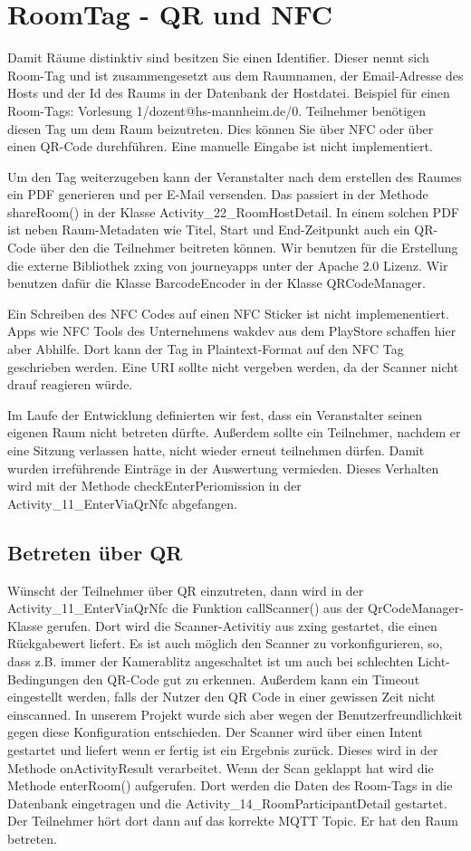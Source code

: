 \section{RoomTag - QR und NFC}
\label{sec:RoomTag - QR und NFC}
Damit Räume distinktiv sind besitzen Sie einen Identifier. Dieser nennt sich Room-Tag und ist zusammengesetzt aus dem Raumnamen, der Email-Adresse des Hosts und der Id des Raums in der Datenbank der Hostdatei. Beispiel für einen Room-Tags: Vorlesung 1/dozent@hs-mannheim.de/0.
Teilnehmer benötigen diesen Tag um dem Raum beizutreten. Dies können Sie über NFC oder über einen QR-Code durchführen. Eine manuelle Eingabe ist nicht implementiert.

Um den Tag weiterzugeben kann der Veranstalter nach dem erstellen des Raumes ein PDF generieren und per E-Mail versenden. 
Das passiert in der Methode shareRoom() in der Klasse Activity\_22\_RoomHostDetail. 
In einem solchen PDF ist neben Raum-Metadaten wie Titel, Start und End-Zeitpunkt auch ein QR-Code über den die Teilnehmer beitreten können. 
Wir benutzen für die Erstellung die externe Bibliothek zxing von journeyapps unter der Apache 2.0 Lizenz. Wir benutzen dafür die Klasse BarcodeEncoder in der Klasse QRCodeManager.

Ein Schreiben des NFC Codes auf einen NFC Sticker ist nicht implemenentiert.
 Apps wie NFC Tools des Unternehmens wakdev aus dem PlayStore schaffen hier aber Abhilfe. Dort kann der Tag in Plaintext-Format auf den NFC Tag geschrieben werden.
Eine URI sollte nicht vergeben werden, da der Scanner nicht drauf reagieren würde.

Im Laufe der Entwicklung definierten wir fest, dass ein Veranstalter seinen eigenen Raum nicht betreten dürfte. Außerdem sollte ein Teilnehmer, nachdem er eine Sitzung verlassen hatte, nicht wieder erneut teilnehmen dürfen. Damit wurden irreführende Einträge in der Auswertung vermieden. Dieses Verhalten wird mit der Methode checkEnterPeriomission in der Activity\_11\_EnterViaQrNfc abgefangen.
\subsection{Betreten über QR}
\label{subsec: Betreten über QR}
Wünscht der Teilnehmer über QR einzutreten, dann wird in der Activity\_11\_EnterViaQrNfc die Funktion callScanner() aus der QrCodeManager-Klasse gerufen. Dort wird die Scanner-Activitiy aus zxing gestartet, die einen Rückgabewert liefert. Es ist auch möglich den Scanner zu vorkonfigurieren, so, dass z.B. immer der Kamerablitz angeschaltet ist um auch bei schlechten Licht-Bedingungen den QR-Code gut zu erkennen. 
Außerdem kann ein Timeout eingestellt werden, falls der Nutzer den QR Code in einer gewissen Zeit nicht einscanned.
In unserem Projekt wurde sich aber wegen der Benutzerfreundlichkeit gegen diese Konfiguration entschieden.
Der Scanner wird über einen Intent gestartet und liefert wenn er fertig ist ein Ergebnis zurück.
Dieses wird in der Methode onActivityResult verarbeitet. Wenn der Scan geklappt hat wird die Methode enterRoom() aufgerufen. Dort werden die Daten des Room-Tags in die Datenbank eingetragen und die Activity\_14\_RoomParticipantDetail gestartet. Der Teilnehmer hört dort dann auf das korrekte MQTT Topic. Er hat den Raum betreten.
